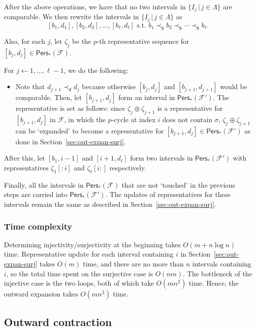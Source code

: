 \documentclass[letterpaper,11pt]{article}
\theoremstyle{mythmstyle}
\theoremstyle{mydefstyle}
\theoremstyle{plain}
\theoremstyle{definition}
\newcommand{\Pers}{\mathsf{Pers}}
\newcommand{\<}[1]{\langle #1\rangle}
\newcommand{\given}{\,|\,}
\newcommand{\Set}[1]{\{#1\}}
\newcommand{\Fcal}{\mathcal{F}}
\newcommand{\LG}{\Lambda}
\newcommand{\sG}{\sigma}
\newcommand{\Dim}{p}
\newcommand{\filtcnt}{m}
\newcommand{\simpcnt}{n}
\newcommand{\bles}{\prec_{\mathsf{b}}}
\newcommand{\dles}{\prec_{\mathsf{d}}}
\newcommand{\repsum}{\oplus}
\newcommand{\rseq}{\zeta}
\newcommand{\rsprefix}[1]{{[:\!#1]}}
\newcommand{\rssuffix}[1]{{[#1\!:]}}
\begin{document}
After the above operations, we have that no two intervals in 
$\Set{I_j\given j\in\LG}$ are comparable. 
We then rewrite the intervals in $\Set{I_j\given j\in\LG}$ as 
\[[b_1,d_1],[b_2,d_2],\ldots,[b_\ell,d_\ell]\text{ s.t.\ }b_1\bles b_2\bles\cdots\bles b_\ell.\]

Also, for each $j$, let $\rseq_j$ be the $\Dim$-th representative sequence
for $[b_j,d_j]\in\Pers_*(\Fcal)$.

For $j\leftarrow 1,\ldots,\ell-1$, we do the following:
\begin{itemize}
    \item Note that $d_{j+1}\dles d_j$
because otherwise $[b_j,d_j]$ and $[b_{j+1},d_{j+1}]$ would be comparable.
Then, let $[b_{j+1},d_j]$ form an interval in $\Pers_*(\Fcal')$.
The representative is set as follows:
since $\rseq_j\repsum\rseq_{j+1}$ is a representative for $[b_{j+1},d_j]$
in $\Fcal$,
in which the $\Dim$-cycle at index $i$ does not contain $\sG$,
$\rseq_j\repsum\rseq_{j+1}$ can be `expanded' to become 
a representative for $[b_{j+1},d_j]\in\Pers_*(\Fcal')$
as done in Section~\ref{sec:out-expan-surj}.
\end{itemize}

After this, let $[b_1,i-1]$ and $[i+1,d_\ell]$ form two intervals in $\Pers_*(\Fcal')$
with representatives $\rseq_1\rsprefix{i}$ and $\rseq_\ell\rssuffix{i}$
respectively.

Finally,
all the intervals in $\Pers_*(\Fcal)$
that are not `touched' in the previous steps
are carried into $\Pers_*(\Fcal')$.
The updates of representatives for these intervals
remain the same as described in Section~\ref{sec:out-expan-surj}.

\subsubsection{Time complexity}
\label{sec:out-expan-complexity}
Determining injectivity/surjectivity at the beginning takes $O(\filtcnt+\simpcnt\log \simpcnt)$
time.
Representative update for each interval containing $i$
in Section~\ref{sec:out-expan-surj}
takes $O(\filtcnt)$ time,
and there are no more than $\simpcnt$ intervals containing $i$,
so the total time spent on the surjective case is $O(\filtcnt\simpcnt)$.
The bottleneck of the injective case is the two loops,
both of which take $O(\filtcnt\simpcnt^2)$ time.
Hence, the outward expansion takes $O(\filtcnt\simpcnt^2)$ time.

\subsection{Outward contraction}
\label{sec:out-contra}
\end{document}
